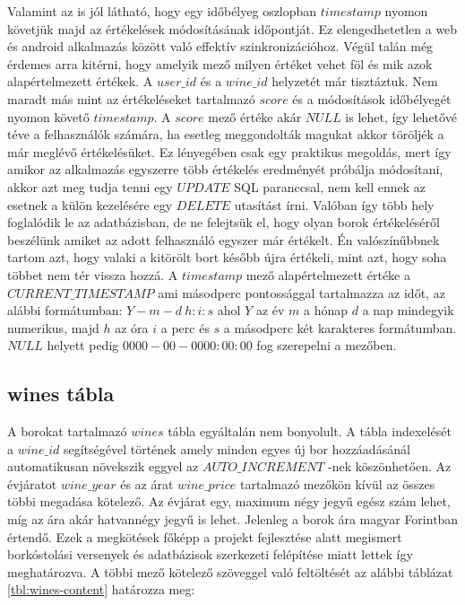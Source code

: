\documentclass[12pt]{report}
\theoremstyle{definition}
\begin{document}
	Valamint az is jól látható, hogy egy időbélyeg oszlopban $timestamp$ nyomon követjük majd az értékelések módosításának időpontját. Ez elengedhetetlen a web és android alkalmazás között való effektív szinkronizációhoz. Végül talán még érdemes arra kitérni, hogy amelyik mező milyen értéket vehet föl és mik azok alapértelmezett értékek. A $user\_id$ és a $wine\_id$ helyzetét már tisztáztuk. Nem maradt más mint az értékeléseket tartalmazó $score$ és a módosítások időbélyegét nyomon követő $timestamp$. A $score$ mező értéke akár $NULL$ is lehet, így lehetővé téve a felhasználók számára, ha esetleg meggondolták magukat akkor töröljék a már meglévő értékelésüket. Ez lényegében csak egy praktikus megoldás, mert így amikor az alkalmazás egyszerre több értékelés eredményét próbálja módosítani, akkor azt meg tudja tenni egy $UPDATE$ SQL paranccsal, nem kell ennek az esetnek a külön kezelésére egy $DELETE$ utasítást írni. Valóban így több hely foglalódik le az adatbázisban, de ne felejtsük el, hogy olyan borok értékeléséről beszélünk amiket az adott felhasználó egyszer már értékelt. Én valószínűbbnek tartom azt, hogy valaki a kitörölt bort később újra értékeli, mint azt, hogy soha többet nem tér vissza hozzá. A $timestamp$ mező alapértelmezett értéke a $CURRENT\_TIMESTAMP$ ami másodperc pontossággal tartalmazza az időt, az alábbi formátumban: $Y-m-d\ h:i:s$ ahol $Y$ az év $m$ a hónap $d$ a nap mindegyik numerikus, majd $h$ az óra $i$ a perc és $s$ a másodperc két karakteres formátumban. $NULL$ helyett pedig $0000-00-00 00:00:00$ fog szerepelni a mezőben.
	
	\subsection{wines tábla}
	
	A borokat tartalmazó $wines$ tábla egyáltalán nem bonyolult. A tábla indexelését a \linebreak$wine\_id$ segítségével történek amely minden egyes új bor hozzáadásánál automatikusan növekszik eggyel az $AUTO\_INCREMENT$ -nek köszönhetően. Az évjáratot \linebreak$wine\_year$ és az árat $wine\_price$ tartalmazó mezőkön kívül az összes többi megadása kötelező. Az évjárat egy, maximum négy jegyű egész szám lehet, míg az ára akár hatvannégy jegyű is lehet. Jelenleg a borok ára magyar Forintban értendő. Ezek a megkötések főképp a projekt fejlesztése alatt megismert borkóstolási versenyek és adatbázisok szerkezeti felépítése miatt lettek így meghatározva. A többi mező kötelező szöveggel való feltöltését az alábbi táblázat \ref{tbl:wines-content} határozza meg:
	
\end{document}
